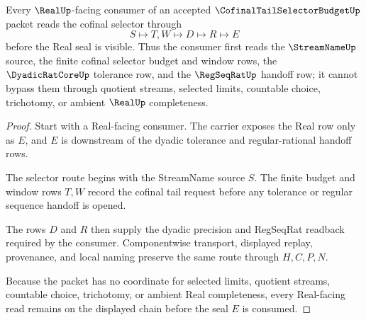 \begin{theorem}
\label{thm:cofinal-tail-selector-budget-regseqrat-handoff}
Every $\RealUp$-facing consumer of an accepted $\CofinalTailSelectorBudgetUp$ packet reads the cofinal selector through
$$
S \longmapsto T,W \longmapsto D \longmapsto R \longmapsto E
$$
before the Real seal is visible. Thus the consumer first reads the $\StreamNameUp$ source, the finite cofinal selector budget and window rows, the $\DyadicRatCoreUp$ tolerance row, and the $\RegSeqRatUp$ handoff row; it cannot bypass them through quotient streams, selected limits, countable choice, trichotomy, or ambient $\RealUp$ completeness.
\end{theorem}
\begin{proof}
Start with a Real-facing consumer. The carrier exposes the Real row only as $E$, and $E$ is downstream of the dyadic tolerance and regular-rational handoff rows.

The selector route begins with the StreamName source $S$. The finite budget and window rows $T,W$ record the cofinal tail request before any tolerance or regular sequence handoff is opened.

The rows $D$ and $R$ then supply the dyadic precision and RegSeqRat readback required by the consumer. Componentwise transport, displayed replay, provenance, and local naming preserve the same route through $H,C,P,N$.

Because the packet has no coordinate for selected limits, quotient streams, countable choice, trichotomy, or ambient Real completeness, every Real-facing read remains on the displayed chain before the seal $E$ is consumed.
\end{proof}



